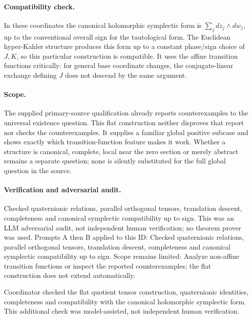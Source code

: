 \documentclass[11pt]{article}
\begin{document}
\paragraph{Compatibility check.}In these coordinates the canonical holomorphic symplectic form is \(\sum_j dz_j\wedge dw_j\), up to the conventional overall sign for the tautological form. The Euclidean hyper-Kahler structure produces this form up to a constant phase/sign choice of \(J,K\), so this particular construction is compatible. It uses the affine transition functions critically: for general base coordinate changes, the conjugate-linear exchange defining \(J\) does not descend by the same argument.
\paragraph{Scope.}The supplied primary-source qualification already reports counterexamples to the universal existence question. This flat construction neither disproves that report nor checks the counterexamples. It supplies a familiar global positive subcase and shows exactly which transition-function feature makes it work. Whether a structure is canonical, complete, local near the zero section or merely abstract remains a separate question; none is silently substituted for the full global question in the source.

\paragraph{Verification and adversarial audit.}
Checked quaternionic relations, parallel orthogonal tensors, translation descent, completeness and canonical symplectic compatibility up to sign. This was an LLM adversarial audit, not independent human verification; no theorem prover was used. Prompts A then B applied to this ID: Checked quaternionic relations, parallel orthogonal tensors, translation descent, completeness and canonical symplectic compatibility up to sign. Scope remains limited: Analyze non-affine transition functions or inspect the reported counterexamples; the flat construction does not extend automatically.

Coordinator checked the flat quotient tensor construction, quaternionic identities, completeness and compatibility with the canonical holomorphic symplectic form. This additional check was model-assisted, not independent human verification.
\end{document}
